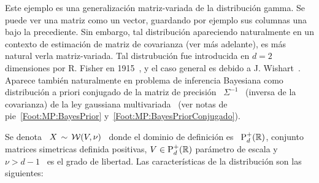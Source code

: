 \label{Sssec:MP:Wishart}

Este ejemplo es una  generalizaci\'on matriz-variada de la distribuci\'on gamma.
Se puede ver  una matriz como un vector, guardando por  ejemplo sus columnas una
bajo la  precediente.  Sin embargo, tal  distribuci\'on apareciendo naturalmente
en un contexto de estimaci\'on de  matriz de covarianza (ver m\'as adelante), es
m\'as natural verla matriz-variada.  Tal distrubuci\'on fue introducida en $d=2$
dimensiones por R. Fisher en 1915~\cite{Fis15}, y el caso general es debido a J.
Wishart~\cite{Wis28,   Mui82,  BilBre99,   GupNag99,  And03,   Seb04}.   Aparece
tambi\'en naturalmente en problema de inferencia Bayesiana como distribuci\'on a
priori conjugado  de la matriz de  precisi\'on \ $\Sigma^{-1}$ \  (inversa de la
covarianza)  de  la  ley gaussiana  multivariada~\cite[Ec.~(4.4.5)]{Rob07}  (ver
notas de pie~\ref{Foot:MP:BayesPrior} y~\ref{Foot:MP:BayesPriorConjugado}).

Se denota  \ $X \, \sim  \, \mathcal{W}(V,\nu)$ \ donde  el dominio de  definici\'on es \
$\mathrm{P}_d^+(\mathbb{R})$,  conjunto   matrices  simetricas  definida   positivas,  $V  \in
\mathrm{P}_d^+(\mathbb{R})$ par\'ametro de escala  y \ $\nu > d-1$ \ es  el grado de libertad.
Las caracter\'isticas de la distribuci\'on son las siguientes:

